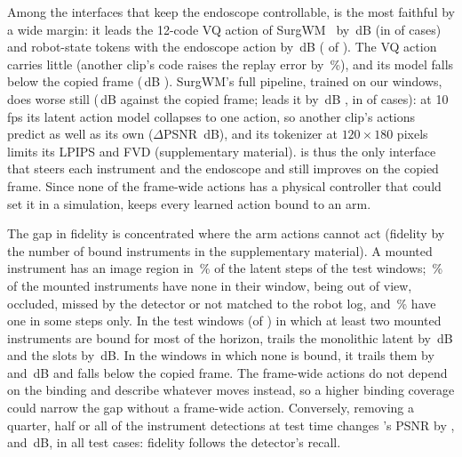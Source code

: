 Among the interfaces that keep the endoscope controllable, \method{} is the most faithful by a wide margin: it leads the 12-code VQ action of SurgWM~\cite{surgwm} by \,dB  (in  of  cases) and robot-state tokens with the endoscope action by \,dB  ( of ). The VQ action carries little (another clip's code raises the replay error by \,\%), and its model falls below the copied frame (\,dB ). SurgWM's full pipeline, trained on our windows, does worse still (\,dB  against the copied frame; \method{} leads it by \,dB , in  of  cases): at 10\,fps its latent action model collapses to one action, so another clip's actions predict as well as its own ($\Delta$PSNR \,dB), and its tokenizer at $120\times180$ pixels limits its LPIPS and FVD (supplementary material). \method{} is thus the only interface that steers each instrument and the endoscope and still improves on the copied frame. Since none of the frame-wide actions has a physical controller that could set it in a simulation, \method{} keeps every learned action bound to an arm.

The gap in fidelity is concentrated where the arm actions cannot act (fidelity by the number of bound instruments in the supplementary material). A mounted instrument has an image region in \,\% of the latent steps of the test windows; \,\% of the mounted instruments have none in their window, being out of view, occluded, missed by the detector or not matched to the robot log, and \,\% have one in some steps only. In the  test windows (of ) in which at least two mounted instruments are bound for most of the horizon, \method{} trails the monolithic latent by \,dB and the slots by \,dB. In the  windows in which none is bound, it trails them by  and \,dB and falls below the copied frame. The frame-wide actions do not depend on the binding and describe whatever moves instead, so a higher binding coverage could narrow the gap without a frame-wide action. Conversely, removing a quarter, half or all of the instrument detections at test time changes \method{}'s PSNR by ,  and \,dB, in all  test cases: fidelity follows the detector's recall.

